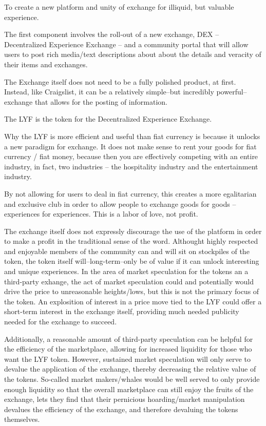 \documentclass[11pt]{article}
\begin{document}
To create a new platform and unity of exchange for illiquid, but valuable experience.

The first component involves the roll-out of a new exchange, DEX -- Decentralized Experience Exchange -- and a community portal that will allow users to post rich media/text descriptions about about the details and veracity of their items and exchanges.

The Exchange itself does not need to be a fully polished product, at first. Instead, like Craigslist, it can be a relatively simple--but incredibly powerful--exchange that allows for the posting of information. 

The LYF is the token for the Decentralized Experience Exchange. 

Why the LYF is more efficient and useful than fiat currency is because it unlocks a new paradigm for exchange. It does not make sense to rent your goods for fiat currency / fiat money, because then you are effectively competing with an entire industry, in fact, two industries -- the hospitality industry and the entertainment industry.

By not allowing for users to deal in fiat currency, this creates a more egalitarian and exclusive club in order to allow people to exchange goods for goods -- experiences for experiences. This is a labor of love, not profit.

The exchange itself does not expressly discourage the use of the platform in order to make a profit in the traditional sense of the word. Althought highly respected and enjoyable members of the community can and will sit on stockpiles of the token, the token itself will--long-term--only be of value if it can unlock interesting and unique experiences. In the area of market speculation for the tokens an a third-party exhange, the act of market speculation could and potentially would drive the price to unreasonable heights/lows, but this is not the primary focus of the token. An explosition of interest in a price move tied to the LYF could offer a short-term interest in the exchange itself, providing much needed publicity needed for the exchange to succeed.

Additionally, a reasonable amount of third-party speculation can be helpful for the efficiency of the marketplace, allowing for increased liquidity for those who want the LYF token. However, sustained market speculation will only serve to devalue the application of the exchange, thereby decreasing the relative value of the tokens. So-called market makers/whales would be well served to only provide enough liquidity so that the overall marketplace can still enjoy the fruits of the exchange, lets they find that their pernicious hoarding/market manipulation devalues the efficiency of the exchange, and therefore devaluing the tokens themselves.
\end{document}
